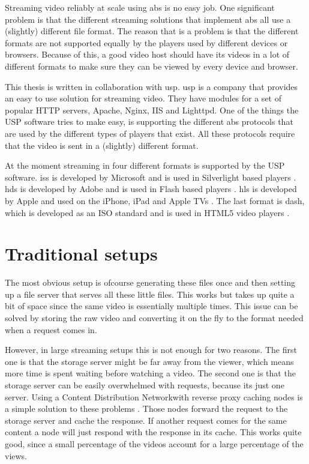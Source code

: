 \documentclass[twoside,openright]{uva-bachelor-thesis}
\begin{document}
Streaming video reliably at scale using \gls{abs} is no easy job. One significant
problem is that the different streaming solutions that implement \gls{abs} all
use a (slightly) different file format. The reason that is a problem is that the
different formats are not supported equally by the players used by different
devices or browsers. Because of this, a good video host should have its videos
in a lot of different formats to make sure they can be viewed by every device
and browser.


This thesis is written in collaboration with \gls{usp}. \gls{usp} is a company
that provides an easy to use solution for streaming video. They have modules for
a set of popular HTTP servers, Apache, Nginx, IIS and Lighttpd.  One of the
things the USP software tries to make easy, is supporting the different
\gls{abs} protocols that are used by the different types of players that exist.
All these protocols require that the video is sent in a (slightly) different
format.

At the moment streaming in four different formats is supported by the USP
software. \Gls{iss} is developed by
Microsoft and is used in Silverlight based players \autocite{iss}. \Gls{hds}
 is developed by Adobe and is used in Flash based players \autocite{hds}.
\Gls{hls} is developed by Apple and used on the iPhone, iPad
and Apple TVs \autocite{hls}. The last format is \gls{dash},
which is developed as an ISO standard and is used in HTML5 video players
\autocite{dash}.


\section{Traditional setups}
The most obvious setup is ofcourse generating these files once and then setting
up a file server that serves all these little files. This works but takes up
quite a bit of space since the same video is essentially multiple
times. This issue can be solved by storing the raw video and converting it on
the fly to the format needed when a request comes in.

However, in large streaming setups this is not enough for two reasons. The first
one is that the storage server might be far away from the viewer, which means
more time is spent waiting before watching a video. The second one is that the
storage server can be easily overwhelmed with requests, because its just one
server. Using a Content Distribution
Networkwith reverse proxy caching nodes is a simple solution to these problems
\autocites{cdns}{revproxy}.  Those nodes forward the request to the storage
server and cache the response. If another request comes for the same content a
node will just respond with the response in its cache. This works quite good,
since a small percentage of the videos account for a large percentage of the
views.
\end{document}

